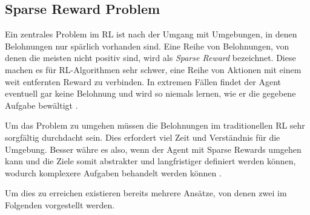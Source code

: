 \subsection{Sparse Reward Problem}
\label{sec:sparse_reward}
Ein zentrales Problem im RL ist nach \cite{hare2019dealing} der Umgang mit Umgebungen, in denen Belohnungen nur spärlich vorhanden sind. Eine Reihe von Belohnungen, von denen die meisten nicht positiv sind, wird als \textit{Sparse Reward} bezeichnet. Diese machen es für RL-Algorithmen sehr schwer, eine Reihe von Aktionen mit einem weit entfernten Reward zu verbinden. In extremen Fällen findet der Agent eventuell gar keine Belohnung und wird so niemals lernen, wie er die gegebene Aufgabe bewältigt \cite{hare2019dealing}.

Um das Problem zu umgehen müssen die Belohnungen im traditionellen RL sehr sorgfältig durchdacht sein. Dies erfordert viel Zeit und Verständnis für die Umgebung. Besser währe es also, wenn der Agent mit Sparse Rewards umgehen kann und die Ziele somit abstrakter und langfristiger definiert werden können, wodurch komplexere Aufgaben behandelt werden können \cite{hare2019dealing}.

Um dies zu erreichen existieren bereits mehrere Ansätze, von denen zwei im Folgenden vorgestellt werden.